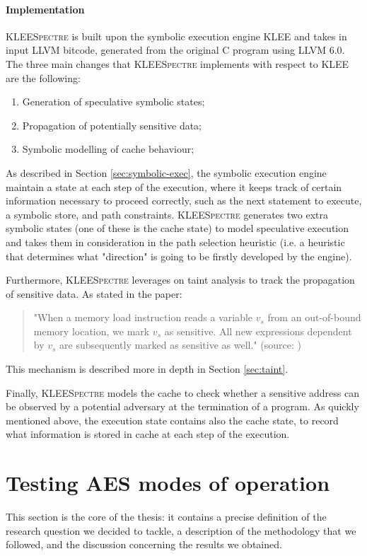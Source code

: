 \documentclass[12pt,a4paper]{book}
\theoremstyle{definition}
\begin{document}
	\paragraph{Implementation} \textsc{KLEESpectre} is built upon the symbolic execution engine KLEE \cite{Cadar2008} and takes in input LLVM bitcode, generated from the original C program using LLVM 6.0. The three main changes that \textsc{KLEESpectre} implements with respect to KLEE are the following:
	\begin{enumerate}
		\item Generation of speculative symbolic states;
		\item Propagation of potentially sensitive data;
		\item Symbolic modelling of cache behaviour;
	\end{enumerate}
	As described in Section \ref{sec:symbolic-exec}, the symbolic execution engine maintain a state at each step of the execution, where it keeps track of certain information necessary to proceed correctly, such as the next statement to execute, a symbolic store, and path constraints. \textsc{KLEESpectre} generates two extra symbolic states (one of these is the cache state) to model speculative execution and takes them in consideration in the path selection heuristic (i.e. a heuristic that determines what "direction" is going to be firstly developed by the engine).
	
	Furthermore, \textsc{KLEESpectre} leverages on taint analysis to track the propagation of sensitive data. As stated in the paper:
	\begin{quote}
		"When a memory load instruction reads a variable $v_s$ from an out-of-bound memory location, we mark $v_s$ as sensitive. All new expressions dependent by $v_s$ are subsequently marked as sensitive as well." (source: \cite{Wang2020})
	\end{quote} 
	This mechanism is described more in depth in Section \ref{sec:taint}.
	
	Finally, \textsc{KLEESpectre} models the cache to check whether a sensitive address can be observed by a potential adversary at the termination of a program. As quickly mentioned above, the execution state contains also the cache state, to record what information is stored in cache at each step of the execution.
	
	\section{Testing AES modes of operation}\label{sec:testing}
	This section is the core of the thesis: it contains a precise definition of the research question we decided to tackle, a description of the methodology that we followed, and the discussion concerning the results we obtained.
	
\end{document}
